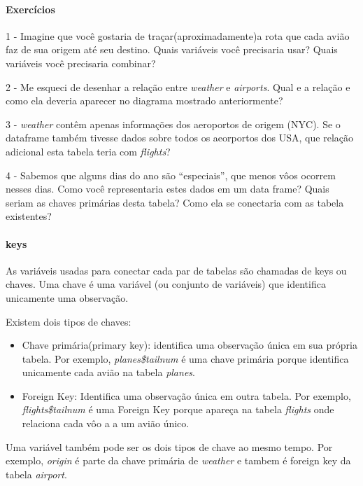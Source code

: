 \documentclass[
]{article}
\begin{document}
\hypertarget{exercuxedcios}{%
\paragraph{Exercícios}\label{exercuxedcios}}

1 - Imagine que você gostaria de traçar(aproximadamente)a rota que cada
avião faz de sua origem até seu destino. Quais variáveis você precisaria
usar? Quais variáveis você precisaria combinar?

2 - Me esqueci de desenhar a relação entre \emph{weather} e
\emph{airports}. Qual e a relação e como ela deveria aparecer no
diagrama mostrado anteriormente?

3 - \emph{weather} contêm apenas informações dos aeroportos de origem
(NYC). Se o dataframe também tivesse dados sobre todos os aeorportos dos
USA, que relação adicional esta tabela teria com \emph{flights}?

4 - Sabemos que alguns dias do ano são ``especiais'', que menos vôos
ocorrem nesses dias. Como você representaria estes dados em um data
frame? Quais seriam as chaves primárias desta tabela? Como ela se
conectaria com as tabela existentes?

\hypertarget{keys}{%
\paragraph{keys}\label{keys}}

As variáveis usadas para conectar cada par de tabelas são chamadas de
keys ou chaves. Uma chave é uma variável (ou conjunto de variáveis) que
identifica unicamente uma observação.

Existem dois tipos de chaves:

\begin{itemize}
\item
  Chave primária(primary key): identifica uma observação única em sua
  própria tabela. Por exemplo, \emph{planes\$tailnum} é uma chave
  primária porque identifica unicamente cada avião na tabela
  \emph{planes}.
\item
  Foreign Key: Identifica uma observação única em outra tabela. Por
  exemplo, \emph{flights\$tailnum} é uma Foreign Key porque apareça na
  tabela \emph{flights} onde relaciona cada vôo a a um avião único.
\end{itemize}

Uma variável também pode ser os dois tipos de chave ao mesmo tempo. Por
exemplo, \emph{origin} é parte da chave primária de \emph{weather} e
tambem é foreign key da tabela \emph{airport}.
\end{document}
